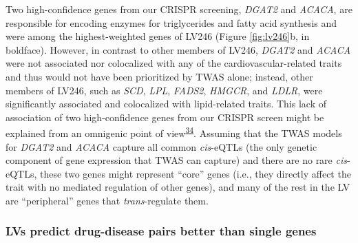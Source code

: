 \documentclass[
  a4paper,
]{article}
\begin{document}
Two high-confidence genes from our CRISPR screening, \emph{DGAT2} and \emph{ACACA}, are responsible for encoding enzymes for triglycerides and fatty acid synthesis and were among the highest-weighted genes of LV246 (Figure \ref{fig:lv246}b, in boldface).
However, in contrast to other members of LV246, \emph{DGAT2} and \emph{ACACA} were not associated nor colocalized with any of the cardiovascular-related traits and thus would not have been prioritized by TWAS alone;
instead, other members of LV246, such as \emph{SCD}, \emph{LPL}, \emph{FADS2}, \emph{HMGCR}, and \emph{LDLR}, were significantly associated and colocalized with lipid-related traits.
This lack of association of two high-confidence genes from our CRISPR screen might be explained from an omnigenic point of view\textsuperscript{\protect\hyperlink{ref-LXvTZzEA}{34}}.
Assuming that the TWAS models for \emph{DGAT2} and \emph{ACACA} capture all common \emph{cis}-eQTLs (the only genetic component of gene expression that TWAS can capture) and there are no rare \emph{cis}-eQTLs, these two genes might represent ``core'' genes (i.e., they directly affect the trait with no mediated regulation of other genes), and many of the rest in the LV are ``peripheral'' genes that \emph{trans}-regulate them.

\hypertarget{lvs-predict-drug-disease-pairs-better-than-single-genes}{%
\subsubsection{LVs predict drug-disease pairs better than single genes}\label{lvs-predict-drug-disease-pairs-better-than-single-genes}}
\end{document}
